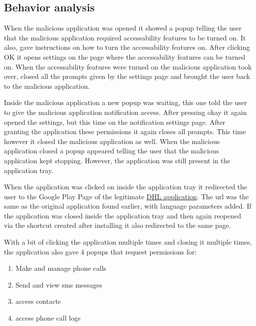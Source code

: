 \subsection{Behavior analysis}

When the malicious application was opened it showed a popup telling the user that the malicious application required accessability features to be turned on.
It also, gave instructions on how to turn the accessability features on.
After clicking OK it opens settings on the page where the accessability features can be turned on. 
When the accessability features were turned on the malicious application took over, closed all the prompts given by the settings page and brought the user back to the malicious application.

Inside the malicious application a new popup was waiting, this one told the user to give the malicious application notification access. After pressing okay it again opened the settings, but this time on the notification settings page. After granting the application these permissions it again closes all prompts. 
This time however it closed the malicious application as well.
When the malicious application closed a popup appeared telling the user that the malicious application kept stopping.
However, the application was still present in the application tray.

When the application was clicked on inside the application tray it redirected the user to the Google Play Page of the legitimate \href{https://play.google.com/store/apps/details?id=com.dhl.exp.dhlmobile&hl=en&gl=US}{DHL application}.
The url was the same as the original application found earlier, with language parameters added.
If the application was closed inside the application tray and then again reopened via the shortcut created after installing it also redirected to the same page.

With a bit of clicking the application multiple times and closing it multiple times, the application also gave 4 popups that request permissions for:
\begin{enumerate}
    \item Make and manage phone calls
    \item Send and view sms messages
    \item access contacts
    \item access phone call logs
\end{enumerate}


